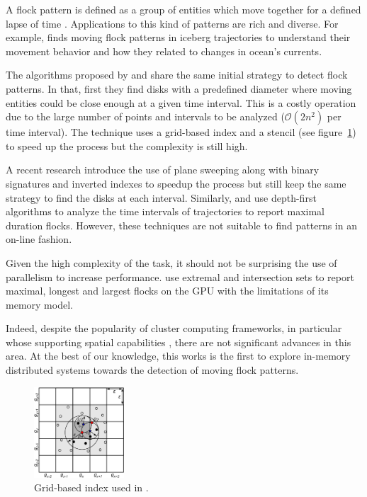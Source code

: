\documentclass[12pt]{scrartcl}
\begin{document}
A flock pattern is defined as a group of entities which move together for a defined lapse of time \citep{benkert_reporting_2008}.  Applications to this kind of patterns are rich and diverse.  For example, \citep{calderon_romero_mining_2011} finds moving flock patterns in iceberg trajectories to understand their movement behavior and how they related to changes in ocean's currents. 
 
The algorithms proposed by \citep{vieira_-line_2009} and \citep{turdukulov_visual_2014} share the same initial strategy to detect flock patterns.  In that, first they find disks with a predefined diameter where moving entities could be close enough at a given time interval.  This is a costly operation due to the large number of points and intervals to be analyzed ($\mathcal{O}(2n^2)$ per time interval).  The technique uses a grid-based index and a stencil (see figure~\ref{fig:grid}) to speed up the process but the complexity is still high.

A recent research \citep{tanaka_improved_2016} introduce the use of plane sweeping along with binary signatures and inverted indexes to speedup the process but still keep the same strategy to find the disks at each interval.  Similarly, \citep{arimura_finding_2014} and \citep{geng_enumeration_2014} use depth-first algorithms to analyze the time intervals of trajectories to report maximal duration flocks.  However, these techniques are not suitable to find patterns in an on-line fashion.

Given the high complexity of the task, it should not be surprising the use of parallelism to increase performance.  \cite{fort_parallel_2014} use extremal and intersection sets to report maximal, longest and largest flocks on the GPU with the limitations of its memory model.  

Indeed, despite the popularity of cluster computing frameworks, in particular whose supporting spatial capabilities \citep{eldawy_spatialhadoop:_2014, yu_demonstration_2016, pellechia_geomesa:_2015-1, xie_simba:_2016-1}, there are not significant advances in this area.  At the best of our knowledge, this works is the first to explore in-memory distributed systems towards the detection of moving flock patterns.

\begin{figure}[t]
 \centering
 \includegraphics[width=0.3\textwidth]{./figures/grid.png}
 \caption{Grid-based index used in \cite{vieira_-line_2009}.}
 \label{fig:grid}
\end{figure}
\end{document}
